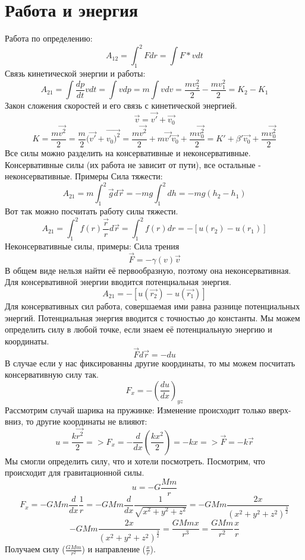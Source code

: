 \section{Работа и энергия}
Работа по определению:
\[A_{12} = \int_1^2 F dr = \int F * v dt\]
Связь кинетической энергии и работы:
\[A_{21} = \int \frac{dp}{dt} v dt = \int v dp = m \int v dv = \frac{mv_2^2}{2} - \frac{mv_1^2}{2} = K_2 - K_1\]
Закон сложения скоростей и его связь с кинетической энергией.
\[\Vec{v} = \Vec{v'} + \Vec{v_0}\]
    \[K = \frac{m\Vec{v^2}}{2} = \frac{m}{2}(\Vec{v'} + \Vec{v_0)^2} = \frac{m\Vec{v^2}}{2} + m\Vec{v'}\Vec{v_0} + \frac{m\Vec{v_0^2}}{2} = K' + \beta'\Vec{v_0} + \frac{m\Vec{v_0^2}}{2} \]
    Все силы можно разделить на консервативные и неконсервативные.
    Консервативные силы (их работа не зависит от пути), все остальные - неконсервативные.
    Примеры
    \newline Сила тяжести:
    \[A_{21} = m \int_1^2 \Vec{g} d\Vec{r} = -mg \int_1^2 dh = -mg(h_2 - h_1)\]
    Вот так можно посчитать работу силы тяжести.
    \[A_{21} = \int_1^2 f(r) \frac{\Vec{r}}{r} d\Vec{r} = \int_1^2 f(r) dr = - [u(r_2) - u(r_1)]\]
    Неконсервативные силы, примеры:
    Сила трения
    \[ \Vec{F} = -\gamma(v)\Vec{v} \]
    В общем виде нельзя найти её первообразную, поэтому она неконсервативная.
    Для консервативной энергии вводится потенциальная энергия. 
    \[A_{21} = -[u(\Vec{r_2}) - u(\Vec{r_1})]\]
    Для консервативных сил работа, совершаемая ими равна разнице потенциальных энергий.
    Потенциальная энергия вводится с точностью до константы.
    Мы можем определить силу в любой точке, если знаем её потенциальную энергию и координаты.
    \[\Vec{F}d\Vec{r} = - du \]
    В случае если у нас фиксированны другие координаты, то мы можем посчитать консервативную силу так.
    \[F_x = - (\frac{du}{dx})_{yz}\]
    Рассмотрим случай шарика на пружинке:
    \newline Изменение происходит только вверх-вниз, то другие координаты не влияют:
    \[u = \frac{k\Vec{r^2}}{2} => F_x = -\frac{d}{dx}(\frac{kx^2}{2}) = -kx => \Vec{F} = -k\Vec{r}\]
    Мы смогли определить силу, что и хотели посмотреть.
    \newline Посмотрим, что происходит для гравитационной силы.
    \[u = -G \frac{Mm}{r}\]
    \[F_x = -GMm \frac{d}{dx} \frac{1}{r} = -GMm \frac{d}{dx} \frac{1}{\sqrt{x^2 + y^2 + z^2}} = -GMm \frac{2x}{(x^2+y^2+z^2)^{\frac{3}{2}}}\]
    \[-GMm \frac{2x}{(x^2+y^2+z^2)^{\frac{3}{2}}} = \frac{GMmx}{r^3} = \frac{GMm}{r^2} \frac{x}{r}\]
    Получаем силу ($\frac{GMm}{r^2}$) и направление ($\frac{x}{r}$).

